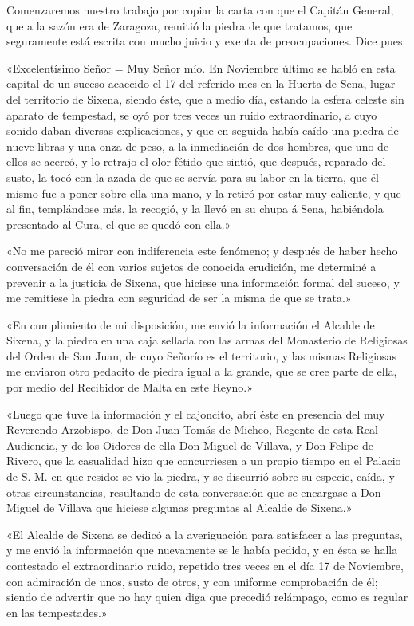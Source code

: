 \documentclass[a4paper, 11pt, oneside, polutonikogreek, spanish]{article}
\begin{document}
Comenzaremos nuestro trabajo por copiar la carta con que el Capitán General, que a la sazón era de Zaragoza, remitió la piedra de que tratamos, que seguramente está escrita con mucho juicio y exenta de preocupaciones. Dice pues:

«Excelentísimo Señor = Muy Señor mío. En Noviembre último se habló en esta capital de un suceso acaecido el 17 del referido mes en la Huerta de Sena, lugar del territorio de Sixena, siendo éste, que a medio día, estando la esfera celeste sin aparato de tempestad, se oyó por tres veces un ruido extraordinario, a cuyo sonido daban diversas explicaciones, y que en seguida había caído una piedra de nueve libras y una onza de peso, a la inmediación de dos hombres, que uno de ellos se acercó, y lo retrajo el olor fétido que sintió, que después, reparado del susto, la tocó con la azada de que se servía para su labor en la tierra, que él mismo fue a poner sobre ella una mano, y la retiró por estar muy caliente, y que al fin, templándose más, la recogió, y la llevó en su chupa á Sena, habiéndola presentado al Cura, el que se quedó con ella.»

«No me pareció mirar con indiferencia este fenómeno; y después de haber hecho conversación de él con varios sujetos de conocida erudición, me determiné a prevenir a la justicia de Sixena, que hiciese una información formal del suceso, y me remitiese la piedra con seguridad de ser la misma de que se trata.»

«En cumplimiento de mi disposición, me envió la información el Alcalde de Sixena, y la piedra en una caja sellada con las armas del Monasterio de Religiosas del Orden de San Juan, de cuyo Señorío es el territorio, y las mismas Religiosas me enviaron otro pedacito de piedra igual a la grande, que se cree parte de ella, por medio del Recibidor de Malta en este Reyno.»

«Luego que tuve la información y el cajoncito, abrí éste en presencia del muy Reverendo Arzobispo, de Don Juan Tomás de Micheo, Regente de esta Real Audiencia, y de los Oidores de ella Don Miguel de Villava, y Don Felipe de Rivero, que la casualidad hizo que concurriesen a un propio tiempo en el Palacio de S. M. en que resido: se vio la piedra, y se discurrió sobre su especie, caída, y otras circunstancias, resultando de esta conversación que se encargase a Don Miguel de Villava que hiciese algunas preguntas al Alcalde de Sixena.»

«El Alcalde de Sixena se dedicó a la averiguación para satisfacer a las preguntas, y me envió la información que nuevamente se le había pedido, y en ésta se halla contestado el extraordinario ruido, repetido tres veces en el día 17 de Noviembre, con admiración de unos, susto de otros, y con uniforme comprobación de él; siendo de advertir que no hay quien diga que precedió relámpago, como es regular en las tempestades.»
\end{document}

